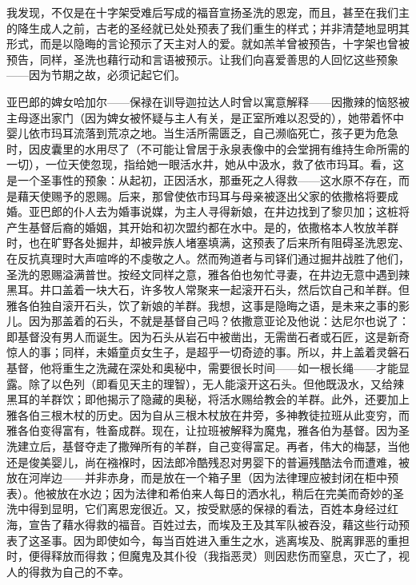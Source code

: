 我发现，不仅是在十字架受难后写成的福音宣扬圣洗的恩宠，而且，甚至在我们主的降生成人之前，古老的圣经就已处处预表了我们重生的样式；并非清楚地显明其形式，而是以隐晦的言论预示了天主对人的爱。就如羔羊曾被预告，十字架也曾被预告，同样，圣洗也藉行动和言语被预示。让我们向喜爱善思的人回忆这些预象——因为节期之故，必须记起它们。\par

亚巴郎的婢女哈加尔——保禄在训导迦拉达人时曾以寓意解释——因撒辣的恼怒被主母逐出家门（因为婢女被怀疑与主人有关，是正室所难以忍受的），她带着怀中婴儿依市玛耳流落到荒凉之地。当生活所需匮乏，自己濒临死亡，孩子更为危急时，因皮囊里的水用尽了（不可能让曾居于永泉表像中的会堂拥有维持生命所需的一切），一位天使忽现，指给她一眼活水井，她从中汲水，救了依市玛耳。看，这是一个圣事性的预象：从起初，正因活水，那垂死之人得救——这水原不存在，而是藉天使赐予的恩赐。后来，那曾使依市玛耳与母亲被逐出父家的依撒格将要成婚。亚巴郎的仆人去为婚事说媒，为主人寻得新娘，在井边找到了黎贝加；这桩将产生基督后裔的婚姻，其开始和初次盟约都在水中。是的，依撒格本人牧放羊群时，也在旷野各处掘井，却被异族人堵塞填满，这预表了后来所有阻碍圣洗恩宠、在反抗真理时大声喧哗的不虔敬之人。然而殉道者与司铎们通过掘井战胜了他们，圣洗的恩赐溢满普世。按经文同样之意，雅各伯也匆忙寻妻，在井边无意中遇到辣黑耳。井口盖着一块大石，许多牧人常聚来一起滚开石头，然后饮自己和羊群。但雅各伯独自滚开石头，饮了新娘的羊群。我想，这事是隐晦之语，是未来之事的影儿。因为那盖着的石头，不就是基督自己吗？依撒意亚论及他说：达尼尔也说了：即基督没有男人而诞生。因为石头从岩石中被凿出，无需凿石者或石匠，这是新奇惊人的事；同样，未婚童贞女生子，是超乎一切奇迹的事。所以，井上盖着灵磐石基督，他将重生之洗藏在深处和奥秘中，需要很长时间——如一根长绳——才能显露。除了以色列（即看见天主的理智），无人能滚开这石头。但他既汲水，又给辣黑耳的羊群饮；即他揭示了隐藏的奥秘，将活水赐给教会的羊群。此外，还要加上雅各伯三根木杖的历史。因为自从三根木杖放在井旁，多神教徒拉班从此变穷，而雅各伯变得富有，牲畜成群。现在，让拉班被解释为魔鬼，雅各伯为基督。因为圣洗建立后，基督夺走了撒殚所有的羊群，自己变得富足。再者，伟大的梅瑟，当他还是俊美婴儿，尚在襁褓时，因法郎冷酷残忍对男婴下的普遍残酷法令而遭难，被放在河岸边——并非赤身，而是放在一个箱子里（因为法律理应被封闭在柜中预表）。他被放在水边；因为法律和希伯来人每日的洒水礼，稍后在完美而奇妙的圣洗中得到显明，它们离恩宠很近。又，按受默感的保禄的看法，百姓本身经过红海，宣告了藉水得救的福音。百姓过去，而埃及王及其军队被吞没，藉这些行动预表了这圣事。因为即使如今，每当百姓进入重生之水，逃离埃及、脱离罪恶的重担时，便得释放而得救；但魔鬼及其仆役（我指恶灵）则因悲伤而窒息，灭亡了，视人的得救为自己的不幸。\par

